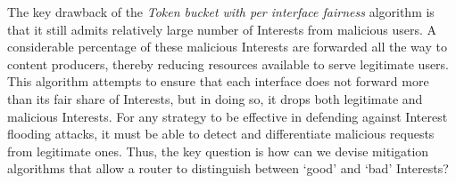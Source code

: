 


The key drawback of the {\it Token bucket with per interface fairness} algorithm is that it still admits relatively large number of Interests from malicious users. A considerable percentage of these malicious Interests are forwarded all the way to content producers, thereby reducing resources available to serve legitimate users.  This algorithm attempts to ensure that each interface does not forward more than its fair share of Interests, but in doing so, it drops both legitimate and malicious Interests. For any strategy to be effective in defending against Interest flooding attacks, it must be able to detect and differentiate malicious requests from legitimate ones. 
Thus, the key question is how can we devise mitigation algorithms that allow a router to distinguish between `good' and `bad' Interests? 


  

